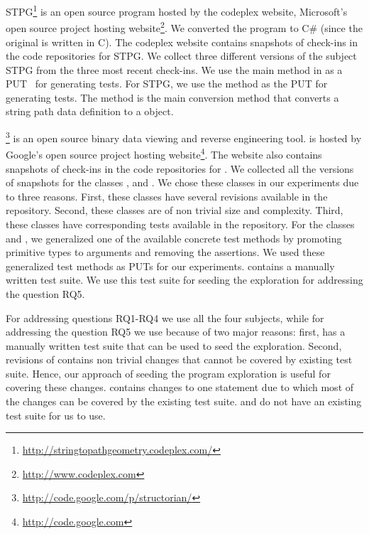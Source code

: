 STPG\footnote{\url{http://stringtopathgeometry.codeplex.com/}} is an open source program hosted by the codeplex website, Microsoft's open source project hosting website\footnote{\url{http://www.codeplex.com}}. 
We converted the  program to C\# (since the
original  is written in C). 
The codeplex website contains snapshots of check-ins in the code repositories for STPG. We collect three different versions of the subject STPG from the three most recent check-ins. We use the main method in  as a PUT~\cite{tillmann05:parameterized} for generating tests. For STPG, we use the  method as the PUT for generating tests. The method  is the main conversion method that converts a string path data definition to a  object.


\footnote{\url{http://code.google.com/p/structorian/}} is an open source binary data viewing and reverse engineering tool.  is hosted by Google's open source project hosting website\footnote{\url{http://code.google.com}}. The website also contains snapshots of check-ins in the code repositories for . We collected all the versions of snapshots for the classes ,  and . We chose these classes in our experiments due to three reasons. First, these classes have several revisions available in the repository. Second, these classes are of non trivial size and complexity. Third, these classes have corresponding tests available in the repository. For the classes  and  , we generalized one of the available concrete test methods by promoting primitive types to arguments and removing the assertions. We used these generalized test methods as PUTs for our experiments.  contains a manually written test suite. We use this test suite for seeding the exploration for addressing the question RQ5.

For addressing questions RQ1-RQ4 we use all the four subjects, while for addressing the question RQ5 we use  because of two major reasons: first,  has a manually written test suite that can be used to seed the exploration. Second, revisions of  contains non trivial changes that cannot be covered by existing test suite. Hence, our approach of seeding the program exploration is useful for covering these changes.  contains changes to one statement due to which most of the changes can be covered by the existing test suite.  and  do not have an existing test suite for us to use.

